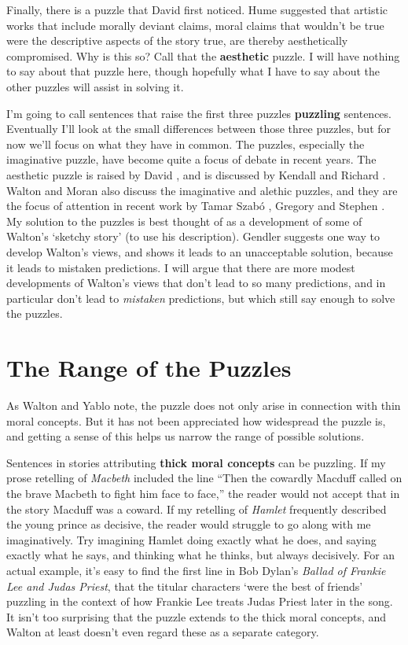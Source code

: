 Finally, there is a puzzle that David \citet{Hume1757} first noticed. Hume suggested that artistic works that include morally deviant claims, moral claims that wouldn't be true were the descriptive aspects of the story true, are thereby aesthetically compromised. Why is this so? Call that the \textbf{aesthetic }puzzle. I will have nothing to say about that puzzle here, though hopefully what I have to say about the other puzzles will assist in solving it.

I'm going to call sentences that raise the first three puzzles \textbf{puzzling} sentences. Eventually I'll look at the small differences between those three puzzles, but for now we'll focus on what they have in common. The puzzles, especially the imaginative puzzle, have become quite a focus of debate in recent years. The aesthetic puzzle is raised by David \citet{Hume1757}, and is discussed by Kendall \citet{Walton1994} and Richard \citet{Moran1995}. Walton and Moran also discuss the imaginative and alethic puzzles, and they are the focus of attention in recent work by Tamar Szab\'{o} \citet{Gendler2000}, Gregory \citet{Currie2002} and Stephen \citet{Yablo2002}. My solution to the puzzles is best thought of as a development of some of Walton's `sketchy story' (to use his description). Gendler suggests one way to develop Walton's views, and shows it leads to an unacceptable solution, because it leads to mistaken predictions. I will argue that there are more modest developments of Walton's views that don't lead to so many predictions, and in particular don't lead to \textit{mistaken} predictions, but which still say enough to solve the puzzles.

\section{The Range of the Puzzles}
As Walton and Yablo note, the puzzle does not only arise in connection with thin moral concepts. But it has not been appreciated how widespread the puzzle is, and getting a sense of this helps us narrow the range of possible solutions.

Sentences in stories attributing \textbf{thick moral concepts} can be puzzling. If my prose retelling of \textit{Macbeth} included the line ``Then the cowardly Macduff called on the brave Macbeth to fight him face to face,'' the reader would not accept that in the story Macduff was a coward. If my retelling of \textit{Hamlet} frequently described the young prince as decisive, the reader would struggle to go along with me imaginatively. Try imagining Hamlet doing exactly what he does, and saying exactly what he says, and thinking what he thinks, but always decisively. For an actual example, it's easy to find the first line in Bob Dylan's \textit{Ballad of Frankie Lee and Judas Priest}, that the titular characters `were the best of friends' puzzling in the context of how Frankie Lee treats Judas Priest later in the song. It isn't too surprising that the puzzle extends to the thick moral concepts, and Walton at least doesn't even regard these as a separate category.

